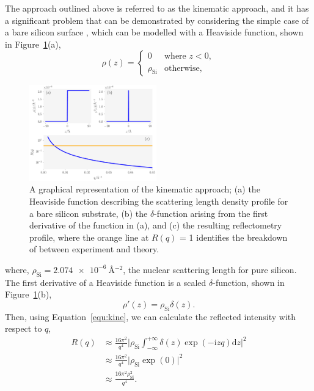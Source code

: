 \documentclass[
 reprint,
 superscriptaddress,
 amsmath,amssymb,
 aps,
]{revtex4-1}
\begin{document}
The approach outlined above is referred to as the kinematic approach, and it has a significant problem that can be demonstrated by considering the simple case of a bare silicon surface \cite{sivia_elementary_2011}, which can be modelled with a Heaviside function, shown in Figure~\ref{fig:kine}(a),
%
\begin{equation}
    \rho(z) = 
    \begin{cases}
        0 & \text{where } z < 0,\\
        \rho_{\text{Si}} & \text{otherwise},
    \end{cases}
\end{equation}
%
%
\begin{figure}[t]
    \includegraphics[width=0.49\textwidth]{kine}
    \caption{A graphical representation of the kinematic approach; (a) the Heaviside function describing the scattering length density profile for a bare silicon substrate, (b) the $\delta$-function arising from the first derivative of the function in (a), and (c) the resulting reflectometry profile, where the orange line at $R(q)$ = 1 identifies the breakdown of between experiment and theory.}
    \label{fig:kine}
\end{figure}
%
where, $\rho_{\text{Si}} = \SI{2.074e-6}{\angstrom^{-2}}$, the nuclear scattering length for pure silicon. 
The first derivative of a Heaviside function is a scaled $\delta$-function, shown in Figure~\ref{fig:kine}(b), 
%
\begin{equation}
    \rho'(z) = \rho_{\text{Si}}\delta(z).
\end{equation}
%
Then, using Equation~\ref{equ:kine}, we can calculate the reflected intensity with respect to $q$, 
%
\begin{equation}
    \begin{aligned}
    R(q) & \approx \frac{16\pi^2}{q^4} \bigg| \rho_{\text{Si}}\int^{+\infty}_{-\infty}{\delta(z)\exp{(-\mathrm{i} zq) \text{d}z}} \bigg|^2 \\ 
     & \approx \frac{16\pi^2}{q^4} \bigg| \rho_{\text{Si}} \exp{(0)} \bigg| ^2 \\
     & \approx \frac{16\pi^2\rho_{\text{Si}}^2}{q^4}.
    \end{aligned}
    \label{equ:baresi}
\end{equation}
\end{document}
